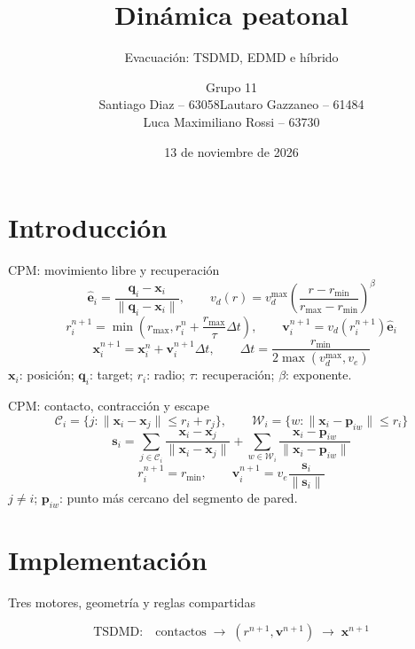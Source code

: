 \documentclass[aspectratio=169,20pt]{beamer}
\title{Dinámica peatonal}
\subtitle{Evacuación: TSDMD, EDMD e híbrido}
\author{Grupo 11\\Santiago Diaz -- 63058\quad Lautaro Gazzaneo -- 61484\\Luca Maximiliano Rossi -- 63730}
\institute{Simulación de Sistemas -- ITBA}
\date{13 de noviembre de 2026}
\newcommand{\vb}[1]{\mathbf{#1}}
\newcommand{\notaBreve}[1]{{\fontsize{18}{22}\selectfont #1}}
\begin{document}
\begin{frame}\titlepage\end{frame}

\section{Introducción}
\begin{frame}{CPM: movimiento libre y recuperación}
\[
 \widehat{\vb e}_i=\frac{\vb q_i-\vb x_i}{\|\vb q_i-\vb x_i\|},\qquad
 v_d(r)=v_d^{\max}\left(\frac{r-r_{\min}}{r_{\max}-r_{\min}}\right)^\beta
\]
\vspace{3mm}
\[
 r_i^{n+1}=\min\!\left(r_{\max},r_i^n+\frac{r_{\max}}{\tau}\Delta t\right),\qquad
 \vb v_i^{n+1}=v_d(r_i^{n+1})\widehat{\vb e}_i
\]
\[
 \vb x_i^{n+1}=\vb x_i^n+\vb v_i^{n+1}\Delta t,\qquad
 \Delta t=\frac{r_{\min}}{2\max(v_d^{\max},v_e)}
\]
\notaBreve{$\vb x_i$: posición; $\vb q_i$: target; $r_i$: radio; $\tau$: recuperación; $\beta$: exponente.}
\end{frame}

\begin{frame}{CPM: contacto, contracción y escape}
\[
 \mathcal C_i=\{j:\|\vb x_i-\vb x_j\|\le r_i+r_j\},\qquad
 \mathcal W_i=\{w:\|\vb x_i-\vb p_{iw}\|\le r_i\}
\]
\[
 \vb s_i=\sum_{j\in\mathcal C_i}\frac{\vb x_i-\vb x_j}{\|\vb x_i-\vb x_j\|}
 +\sum_{w\in\mathcal W_i}\frac{\vb x_i-\vb p_{iw}}{\|\vb x_i-\vb p_{iw}\|}
\]
\[
 r_i^{n+1}=r_{\min},\qquad \vb v_i^{n+1}=v_e\frac{\vb s_i}{\|\vb s_i\|}
\]
\notaBreve{$j\ne i$; $\vb p_{iw}$: punto más cercano del segmento de pared.}
\end{frame}

\section{Implementación}
\begin{frame}{Tres motores, geometría y reglas compartidas}
\centering
{}
\vspace{8mm}
\[
\text{TSDMD:}\quad\text{contactos}\;\longrightarrow\;(r^{n+1},\vb v^{n+1})\;\longrightarrow\;\vb x^{n+1}
\]
\end{frame}
\end{document}
